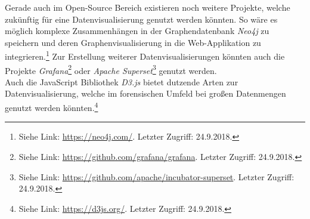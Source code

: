 \noindent
Gerade auch im Open-Source Bereich existieren noch weitere Projekte, welche zukünftig für eine Datenvisualisierung genutzt werden könnten. So wäre es möglich komplexe Zusammenhängen in der Graphendatenbank \textit{Neo4j} zu speichern und deren Graphenvisualisierung in die Web-Applikation zu integrieren.\footnote{Siehe Link: \url{https://neo4j.com/}. Letzter Zugriff: 24.9.2018.} Zur Erstellung weiterer Datenvisualisierungen könnten auch die Projekte \textit{Grafana}\footnote{Siehe Link: \url{https://github.com/grafana/grafana}. Letzter Zugriff: 24.9.2018.} oder \textit{Apache Superset}\footnote{Siehe Link: \url{https://github.com/apache/incubator-superset}. Letzter Zugriff: 24.9.2018.} genutzt werden.\\
Auch die JavaScript Bibliothek \textit{D3.js} bietet dutzende Arten zur Datenvisualisierung, welche im forensischen Umfeld bei großen Datenmengen genutzt werden könnten.\footnote{Siehe Link: \url{https://d3js.org/}. Letzter Zugriff: 24.9.2018.}\\



